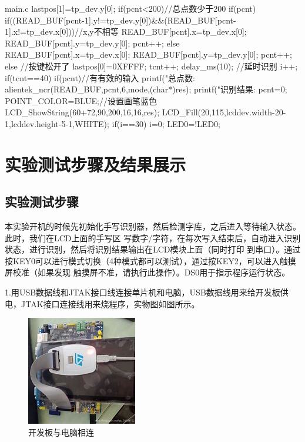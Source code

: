 \documentclass[UTF8]{ctexart}
\begin{document}
\begin{Python}{main.c}
{{{{					lastpos[1]=tp_dev.y[0];
					if(pcnt<200)//总点数少于200
					{
						if(pcnt)
						{
							if((READ_BUF[pcnt-1].y!=tp_dev.y[0])&&(READ_BUF[pcnt-1].x!=tp_dev.x[0]))//x,y不相等
							{
								READ_BUF[pcnt].x=tp_dev.x[0];
								READ_BUF[pcnt].y=tp_dev.y[0]; 
								pcnt++;
							}	
						}else 
						{
							READ_BUF[pcnt].x=tp_dev.x[0];
							READ_BUF[pcnt].y=tp_dev.y[0]; 
							pcnt++;
						}		  
					}   						  				  
				}    
			}else //按键松开了 
			{
				lastpos[0]=0XFFFF;
				tcnt++;
				delay_ms(10);	  
				//延时识别
				i++;	 	    
				if(tcnt==40)
				{
					if(pcnt)//有有效的输入		 
					{
						printf("总点数:%
						alientek_ncr(READ_BUF,pcnt,6,mode,(char*)res);
						printf("识别结果:%
						pcnt=0;	 			    			   
						POINT_COLOR=BLUE;//设置画笔蓝色
						LCD_ShowString(60+72,90,200,16,16,res);	    
					}
					LCD_Fill(20,115,lcddev.width-20-1,lcddev.height-5-1,WHITE);
				} 
			}  
			if(i==30)
			{
				i=0;
				LED0=!LED0;
			}		   
		}       										    			    
	}
\end{Python}
\section{实验测试步骤及结果展示}
\subsection{实验测试步骤}
本实验开机的时候先初始化手写识别器，然后检测字库，之后进入等待输入状态。此时，我们在LCD上面的手写区
写数字/字符，在每次写入结束后，自动进入识别状态，进行识别，然后将识别结果输出在LCD模块上面（同时打印
到串口）。通过按KEY0可以进行模式切换（4种模式都可以测试），通过按KEY2，可以进入触摸屏校准（如果发现
触摸屏不准，请执行此操作）。DS0用于指示程序运行状态。

1.用USB数据线和JTAK接口线连接单片机和电脑，USB数据线用来给开发板供电，JTAK接口连接线用来烧程序，实物图如图所示。
\begin{figure}[H]
	\centering
	\includegraphics[scale = 0.7]{10}
	\caption{开发板与电脑相连}
\end{figure}
\end{document}
